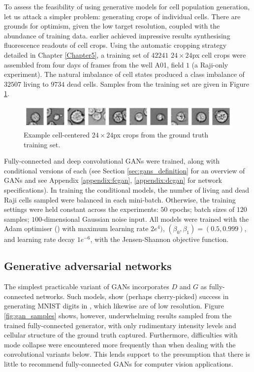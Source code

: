 To assess the feasibility of using generative models for cell population generation, let us attack a simpler problem: generating crops of individual cells. There are grounds for optimism, given the low target resolution, coupled with the abundance of training data. \cite{osokin2017gans} earlier achieved impressive results synthesising fluorescence readouts of cell crops. Using the automatic cropping strategy detailed in Chapter \ref{Chapter5}, a training set of $42241$ $24 \times 24$px cell crops were assembled from four days of frames from the well A01, field $1$ (a Raji-only experiment). The natural imbalance of cell states produced a class imbalance of $32507$ living to $9734$ dead cells. Samples from the training set are given in Figure \ref{fig:reference_samples}.

\begin{figure}[h]
\centering
\includegraphics[width=\textwidth]{img/feasibility_reference_samples.pdf}
\caption{Example cell-centered $24\times 24$px crops from the ground truth training set.}
\label{fig:reference_samples}
\end{figure}

Fully-connected and deep convolutional GANs were trained, along with conditional versions of each (see Section \ref{sec:gans_definition} for an overview of GANs and see Appendix \ref{appendix:fcgan}, \ref{appendix:dcgan} for network specifications). In training the conditional models, the number of living and dead Raji cells sampled were balanced in each mini-batch. Otherwise, the training settings were held constant across the experiments: $50$ epochs; batch sizes of $120$ samples; $100$-dimensional Gaussian noise input. All models were trained with the Adam optimiser (\cite{kingma2014adam}) with maximum learning rate $2e^{4})$, $(\beta_0, \beta_1) = (0.5, 0.999)$, and learning rate decay $1e^{-6}$, with the Jensen-Shannon objective function.

\subsection{Generative adversarial networks}

The simplest practicable variant of GANs incorporates $D$ and $G$ as fully-connected networks. Such models, show (perhaps cherry-picked) success in generating MNIST digits in \cite{goodfellow2014generative}, which likewise are of low resolution. Figure \ref{fig:gan_samples} shows, however, underwhelming results sampled from the trained fully-connected generator, with only rudimentary intensity levels and cellular structure of the ground truth captured. Furthermore, difficulties with mode collapse were  encountered more frequently than when dealing with the convolutional variants below. This lends support to the presumption that there is little to recommend fully-connected GANs for computer vision applications.

